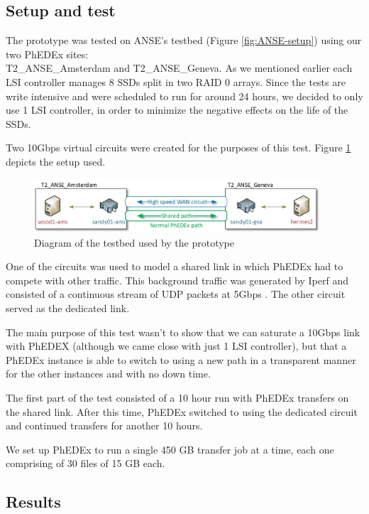 \subsection{Setup and test}

The prototype was tested on ANSE's testbed (Figure \ref{fig:ANSE-setup}) using 
our two PhEDEx sites: \\ T2\_ANSE\_Amsterdam and T2\_ANSE\_Geneva. As we mentioned earlier
each LSI controller manages 8 SSDs split in two RAID 0 arrays. Since the tests are write 
 intensive and were scheduled to run for around 24 hours, we decided to only use 
 1 LSI controller, in order to minimize the negative effects on the life of the SSDs.


Two 10Gbps virtual circuits were created for the purposes of this test. Figure \ref{fig:testbed}
depicts the setup used.

\begin{figure}[h]
  \centering
  \includegraphics[width=0.95\textwidth]{Figures/FileDownload_ANSE_Testbed}
  \caption{Diagram of the testbed used by the prototype}
  \label{fig:testbed}
\end{figure} 

One of the circuits was used to model a shared link in which PhEDEx had to compete 
with other traffic. This background traffic was generated by Iperf and consisted of a 
continuous stream of UDP packets at 5Gbps . The other circuit served as the dedicated
link.

The main purpose of this test wasn't to show that we can saturate a 10Gbps link with
PhEDEX (although we came close with just 1 LSI controller), but that a PhEDEx instance 
is able to switch to using a new path in a transparent manner for the other instances
and with no down time. 

The first part of the test consisted of a 10 hour run with PhEDEx transfers on the 
shared link. After this time, PhEDEx switched to using the dedicated circuit and
continued transfers for another 10 hours.

We set up PhEDEx to run a single 450 GB transfer job at a time, each one 
comprising of 30 files of 15 GB each. 

\subsection{Results}

